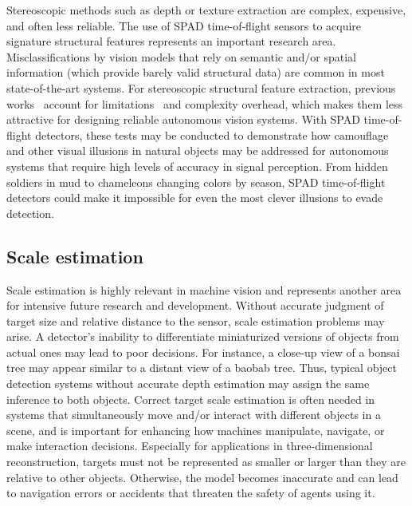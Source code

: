 \documentclass[12pt,a4paper,oneside]{report}
\begin{document}
Stereoscopic methods such as depth or texture extraction are complex, expensive, and often less reliable. The use of SPAD time-of-flight sensors to acquire signature structural features represents an important research area. Misclassifications by vision models that rely on semantic and/or spatial information (which provide barely valid structural data) are common in most state-of-the-art systems. For stereoscopic structural feature extraction, previous works~\cite{hart1973,depthpro2024} account for limitations~\cite{depthpro2024} and complexity overhead, which makes them less attractive for designing reliable autonomous vision systems. With SPAD time-of-flight detectors, these tests may be conducted to demonstrate how camouflage and other visual illusions in natural objects may be addressed for autonomous systems that require high levels of accuracy in signal perception. From hidden soldiers in mud to chameleons changing colors by season, SPAD time-of-flight detectors could make it impossible for even the most clever illusions to evade detection.

\subsection{Scale estimation}
\label{subsec:scale_estimation}

Scale estimation is highly relevant in machine vision and represents another area for intensive future research and development. Without accurate judgment of target size and relative distance to the sensor, scale estimation problems may arise. A detector's inability to differentiate miniaturized versions of objects from actual ones may lead to poor decisions. For instance, a close-up view of a bonsai tree may appear similar to a distant view of a baobab tree. Thus, typical object detection systems without accurate depth estimation may assign the same inference to both objects. Correct target scale estimation is often needed in systems that simultaneously move and/or interact with different objects in a scene, and is important for enhancing how machines manipulate, navigate, or make interaction decisions. Especially for applications in three-dimensional reconstruction, targets must not be represented as smaller or larger than they are relative to other objects. Otherwise, the model becomes inaccurate and can lead to navigation errors or accidents that threaten the safety of agents using it.
\end{document}
